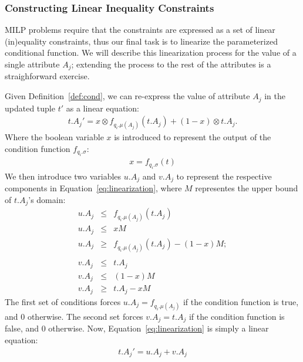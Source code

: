 \subsubsection{Constructing Linear Inequality Constraints}
MILP problems require that the constraints are expressed as a set of linear
(in)equality constraints, thus our final task is to linearize the parameterized
conditional function.   We will describe this linearization process for the value 
of a single attribute $A_j$; extending the process to the rest of the attributes
is a straighforward exercise.

Given Definition~\ref{def:cond}, we can re-express the value of attribute $A_j$ 
in the updated tuple $t'$ as a linear equation:
{\scriptsize
\begin{eqnarray}
\label{eq:linearization}
t.A_j' = x\otimes f_{q_i.\mu(A_j)} (t.A_j) + (1-x)\otimes t.A_j. 
\end{eqnarray} 
}
\noindent Where the boolean variable $x$ is introduced to represent the output of 
the condition function $f_{q_i.\sigma}$:
{\scriptsize
\begin{eqnarray}
\label{eq:x}
x = f_{{q_i}.\sigma}(t)
\end{eqnarray}
}
We then introduce two variables $u.A_j$ and $v.A_j$ to represent 
the respective components in Equation~\ref{eq:linearization}, where
$M$ representes the upper bound of $t.A_j$'s domain:
{\scriptsize 
\begin{eqnarray}
\label{eq:uv}
u.A_j &\leq & f_{q_i.\mu(A_j)} (t.A_j) \nonumber\\
u.A_j &\leq & xM \nonumber\\ 
u.A_j &\geq & f_{q_i.\mu(A_j)} (t.A_j) - (1-x)M ; \nonumber \\\nonumber \\
v.A_j &\leq & t.A_j \nonumber\\
v.A_j &\leq & (1-x)M \nonumber\\
v.A_j &\geq & t.A_j - xM
\end{eqnarray}
}
The first set of conditions forces $u.A_j = f_{q_i.\mu(A_j)}$ if the condition function
is true, and $0$ otherwise.  The second set forces $v.A_j = t.A_j$ if the condition function
is false, and $0$ otherwise.  Now, Equation~\ref{eq:linearization} is simply a linear equation:
{\scriptsize\begin{eqnarray}
\label{eq:tnew}
t.A_j' = u.A_j + v.A_j
\end{eqnarray}}


